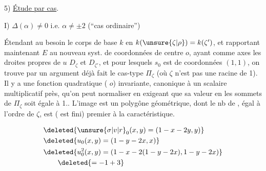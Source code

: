 5) \uline{Étude par cas}.

I) $\Delta(\alpha)\ne0$ \quad i.e. $\alpha\ne\pm2$ \quad (``cas ordinaire'')

Étendant au besoin le corps de base $k$ en $k(\unsure{\zeta|\rho})=k(\zeta')$, et rapportant maintenant $E$ au nouveau syst. de coordonnées de centre $o$, ayant comme axes les droites propres de $u$ $D_\zeta$ et $D_{\zeta'}$, et pour lesquels $s_0$ est de coordonnées $(1,1)$, on trouve par un argument déjà fait le cas-type $\Pi_\zeta$ (où $\zeta$ n'est pas  une racine de 1).
Il y a une fonction quadratique ( $o$) invariante, canonique à un scalaire multiplicatif près, qu'on peut normaliser en exigeant que sa valeur en les sommets de $\Pi_\zeta$ soit égale à 1.. L'image \deleted{$\Pi_\zeta$}  est un polygône géométrique, dont le nb de , égal à l'ordre de $\zeta$, est (  est fini) premier à la caractéristique.

 
\[
\begin{aligned}
&\deleted{\unsure{\sigma|v|r}_0(x,y)=(1-x-2y,y)}\\
&\deleted{u_0(x,y)=(1-y-2x,x)}\\
&\deleted{u_0^2(x,y)=(1-x-2(1-y-2x),1-y-2x)}\\
&\qquad\deleted{=-1+3}
\end{aligned}
\]
